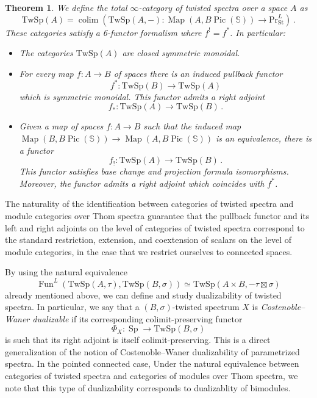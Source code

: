 \documentclass[10pt]{amsart}
\newcommand{\longto}{\longrightarrow}
\theoremstyle{plain}
\newtheorem{theorem}{Theorem}[subsection]
\theoremstyle{definition}
\DeclareMathOperator*{\colim}{colim}
\DeclareMathOperator{\Sp}{Sp}
\DeclareMathOperator{\Fun}{Fun}
\DeclareMathOperator{\Pic}{Pic}
\DeclareMathOperator{\Map}{Map}
\newcommand{\St}{\mathrm{St}}
\newcommand{\bS}{\mathbb{S}}
\newcommand{\TwSp}{\mathrm{TwSp}}
\begin{document}
\begin{theorem}
  We define the total $\infty$-category of twisted spectra over a space $A$ as
  \[
  \TwSp(A) = \colim\left( \TwSp(A,-) : \Map(A,B\Pic(\bS)) \longto \mathrm{Pr}^{L}_{\St}\right) \,.
  \]
  These categories satisfy a 6-functor formalism where $f^! = f^*$. In particular:
  \begin{itemize}
    \item The categories $\TwSp(A)$ are closed symmetric monoidal.
    \item For every map $f : A \to B$ of spaces there is an induced pullback functor
    \[
    f^* : \TwSp(B) \longto \TwSp(A)
    \]
    which is symmetric monoidal. This functor admits a right adjoint
      \[
      f_* : \TwSp(A) \longto \TwSp(B) \,.
      \]
      \item Given a map of spaces $f : A \to B$ such that the induced map $\Map(B,B\Pic(\bS)) \to \Map(A,B\Pic(\bS))$ is an equivalence, there is a functor
      \[
      f_! : \TwSp(A) \longto \TwSp(B) \,.
      \]
      This functor satisfies base change and  projection formula isomorphisms.
      Moreover, the functor admits a right adjoint which coincides with $f^*$.
  \end{itemize}
\end{theorem}

The naturality of the identification between categories of twisted spectra and module categories over Thom spectra guarantee that the pullback functor and its left and right adjoints on the level of categories of twisted spectra correspond to the standard restriction, extension, and coextension of scalars on the level of module categories, in the case that we restrict ourselves to connected spaces.

By using the natural equivalence
\[
\Fun^L(\TwSp(A,\tau),\TwSp(B,\sigma)) \simeq \TwSp(A \times B , - \tau \boxtimes \sigma)
\]
already mentioned above, we can define and study dualizability of twisted spectra.
In particular, we say that a $(B,\sigma)$-twisted spectrum $X$ is \emph{Costenoble--Waner dualizable} if its corresponding colimit-preserving functor
\[
\Phi_X : \Sp \longto \TwSp(B,\sigma)
\]
is such that its right adjoint is itself colimit-preserving.
This is a direct generalization of the notion of Costenoble--Waner dualizability of parametrized spectra.
In the pointed connected case, Under the natural equivalence between categories of twisted spectra and categories of modules over Thom spectra, we note that this type of dualizability corresponds to dualizablity of bimodules.
\end{document}
